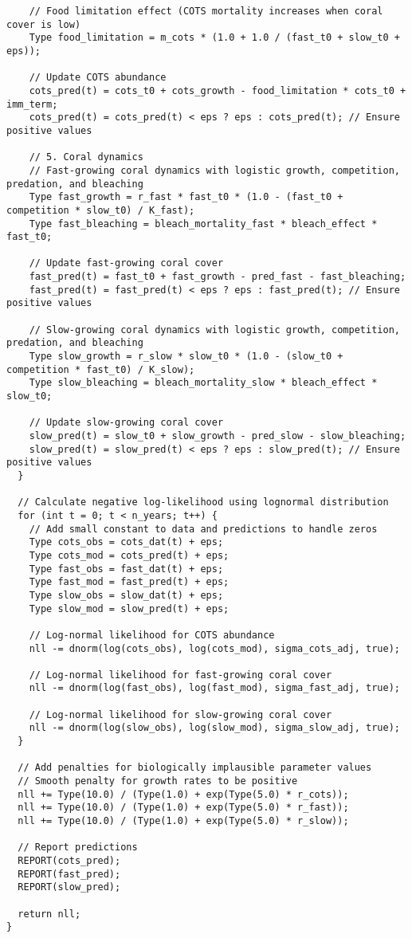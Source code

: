 \begin{lstlisting}
    // Food limitation effect (COTS mortality increases when coral cover is low)
    Type food_limitation = m_cots * (1.0 + 1.0 / (fast_t0 + slow_t0 + eps));
    
    // Update COTS abundance
    cots_pred(t) = cots_t0 + cots_growth - food_limitation * cots_t0 + imm_term;
    cots_pred(t) = cots_pred(t) < eps ? eps : cots_pred(t); // Ensure positive values
    
    // 5. Coral dynamics
    // Fast-growing coral dynamics with logistic growth, competition, predation, and bleaching
    Type fast_growth = r_fast * fast_t0 * (1.0 - (fast_t0 + competition * slow_t0) / K_fast);
    Type fast_bleaching = bleach_mortality_fast * bleach_effect * fast_t0;
    
    // Update fast-growing coral cover
    fast_pred(t) = fast_t0 + fast_growth - pred_fast - fast_bleaching;
    fast_pred(t) = fast_pred(t) < eps ? eps : fast_pred(t); // Ensure positive values
    
    // Slow-growing coral dynamics with logistic growth, competition, predation, and bleaching
    Type slow_growth = r_slow * slow_t0 * (1.0 - (slow_t0 + competition * fast_t0) / K_slow);
    Type slow_bleaching = bleach_mortality_slow * bleach_effect * slow_t0;
    
    // Update slow-growing coral cover
    slow_pred(t) = slow_t0 + slow_growth - pred_slow - slow_bleaching;
    slow_pred(t) = slow_pred(t) < eps ? eps : slow_pred(t); // Ensure positive values
  }
  
  // Calculate negative log-likelihood using lognormal distribution
  for (int t = 0; t < n_years; t++) {
    // Add small constant to data and predictions to handle zeros
    Type cots_obs = cots_dat(t) + eps;
    Type cots_mod = cots_pred(t) + eps;
    Type fast_obs = fast_dat(t) + eps;
    Type fast_mod = fast_pred(t) + eps;
    Type slow_obs = slow_dat(t) + eps;
    Type slow_mod = slow_pred(t) + eps;
    
    // Log-normal likelihood for COTS abundance
    nll -= dnorm(log(cots_obs), log(cots_mod), sigma_cots_adj, true);
    
    // Log-normal likelihood for fast-growing coral cover
    nll -= dnorm(log(fast_obs), log(fast_mod), sigma_fast_adj, true);
    
    // Log-normal likelihood for slow-growing coral cover
    nll -= dnorm(log(slow_obs), log(slow_mod), sigma_slow_adj, true);
  }
  
  // Add penalties for biologically implausible parameter values
  // Smooth penalty for growth rates to be positive
  nll += Type(10.0) / (Type(1.0) + exp(Type(5.0) * r_cots));
  nll += Type(10.0) / (Type(1.0) + exp(Type(5.0) * r_fast));
  nll += Type(10.0) / (Type(1.0) + exp(Type(5.0) * r_slow));
  
  // Report predictions
  REPORT(cots_pred);
  REPORT(fast_pred);
  REPORT(slow_pred);
  
  return nll;
}
\end{lstlisting}

